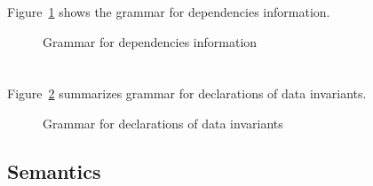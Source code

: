 \nodiff

Figure~\ref{fig:gram:dep} shows the grammar for dependencies information.

\begin{figure}[htp]
  \begin{cadre}
      
    \end{cadre}
  \caption{Grammar for dependencies information}
\label{fig:gram:dep}
\end{figure}


\section{}
\label{sec:invariants}

\nodiff

Figure~\ref{fig:gram:datainvariants} summarizes grammar for declarations of data
invariants.
\begin{figure}[htbp]
  \caption{Grammar for declarations of data invariants}
\label{fig:gram:datainvariants}
\end{figure}



\subsection{Semantics}
\nodiff


\subsection{}
\label{sec:model}

